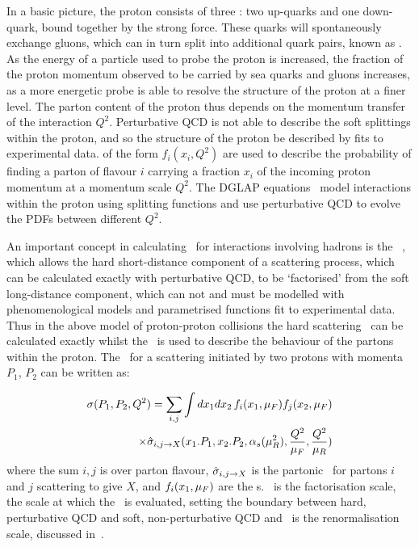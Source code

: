 In a basic picture, the proton consists of three :
two up-quarks and one down-quark, bound together by the strong force. These
quarks will spontaneously exchange gluons, which can in turn split into
additional quark pairs, known as . As the energy of a
particle used to probe the proton is increased, the fraction of the proton
momentum observed to be carried by sea quarks and gluons increases, as a more
energetic probe
is able to resolve the structure of the proton at a finer level. The parton content of
the proton thus depends on the momentum transfer of the interaction $Q^{2}$.
Perturbative QCD is not able to describe the soft splittings within the proton,
and so the structure of the
proton be described by fits to experimental data.  of the form $f_{i}(x_{i}, Q^{2})$ are used to describe the probability of finding a parton of flavour $i$ carrying a
fraction $x_i$ of the incoming proton momentum at a momentum scale $Q^{2}$. The
DGLAP equations~\cite{Altarelli:1977zs} model interactions within the proton using splitting functions
and use perturbative QCD to evolve the PDFs between different $Q^{2}$.

An important concept in calculating \cx\ for interactions involving
hadrons is the ~\cite{ellis2003qcd}, which allows the hard
short-distance component of a scattering process, which can be calculated
exactly with perturbative QCD, to be `factorised' from the soft long-distance
component, which can
not and must be modelled with phenomenological models and parametrised functions
fit to experimental data. Thus in the above model of proton-proton collisions
the hard scattering \cx\ can be calculated exactly whilst the
\partDF\ is used to describe the behaviour of the partons within the proton. The
\cx\ for a scattering initiated by two protons with momenta $P_{1}$, $P_{2}$ can
be written as:

\begin{equation}
\begin{split}
\sigma(P_{1}, P_{2}, Q^{2}) = \sum_{i,j} \int dx_{1} dx_{2} \, f_{i}(x_{1}, \mu_{F})
f_{j}(x_{2}, \mu_{F}) \\
\times \hat{\sigma}_{i,j\rightarrow X} (x_{1}.P_{1}, x_{2}.P_{2}, \alpha_{s}(\mu_{R}^{2}), 
\frac{Q^{2}}{\mu_{F}}, \frac{Q^{2}}{\mu_{R}})
\end{split}
\end{equation}
where the sum $i,j$ is over parton flavour, 
$\hat{\sigma}_{i,j\rightarrow X}$ is the partonic \cx\ for partons $i$ and $j$ 
scattering to give $X$, and  $f_{i}(x_{1}, \mu_{F})$ are the \partDF s. \uF\ is the
factorisation scale, the scale at which the \partDF\ is evaluated, setting the boundary between hard, perturbative QCD and
soft, non-perturbative QCD and \uR\ is the
renormalisation scale, discussed in~.

